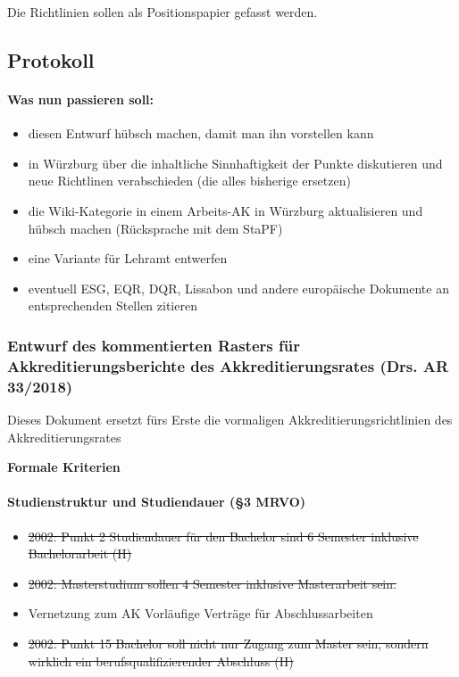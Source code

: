 Die Richtlinien sollen als Positionspapier gefasst werden.

  \subsection*{Protokoll}
    \paragraph{Was nun passieren soll:}
      \begin{itemize}
        \item diesen Entwurf hübsch machen, damit man ihn vorstellen kann
        \item in Würzburg über die inhaltliche Sinnhaftigkeit der Punkte diskutieren und neue Richtlinen verabschieden (die alles bisherige ersetzen)
        \item die Wiki-Kategorie in einem Arbeits-AK in Würzburg aktualisieren und hübsch machen (Rücksprache mit dem StaPF)
        \item eine Variante für Lehramt entwerfen
        \item eventuell ESG, EQR, DQR, Lissabon und andere europäische Dokumente an entsprechenden Stellen zitieren
      \end{itemize}

    \subsubsection*{Entwurf des kommentierten Rasters für Akkreditierungsberichte des Akkreditierungsrates (Drs. AR 33/2018)}
      Dieses Dokument ersetzt fürs Erste die vormaligen Akkreditierungsrichtlinien des Akkreditierungsrates

    \textbf{Formale Kriterien}
      \paragraph{Studienstruktur und Studiendauer (§3 MRVO)}
        \begin{itemize}
          \item \sout{2002: Punkt 2 Studiendauer für den Bachelor sind 6 Semester inklusive Bachelorarbeit (H)} %
          \item \sout{2002: Masterstudium sollen 4 Semester inklusive Masterarbeit sein.}
          \item Vernetzung zum AK Vorläufige Verträge für Abschlussarbeiten
          \item \sout{2002: Punkt 15 Bachelor soll nicht nur Zugang zum Master sein, sondern wirklich ein berufsqualifizierender Abschluss (H)}
        \end{itemize}


